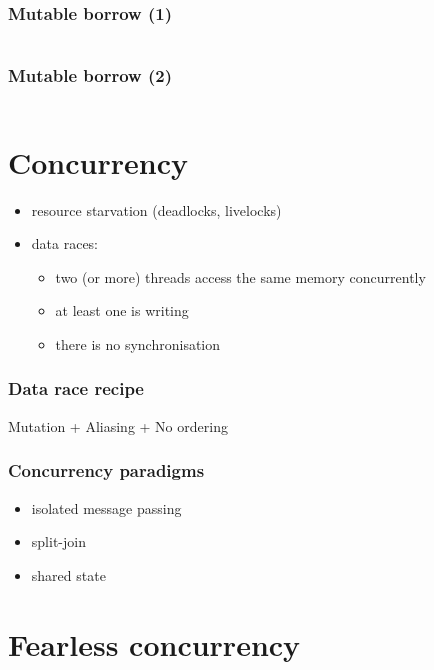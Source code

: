 \documentclass{beamer}
\begin{document}
\begin{frame}
    \frametitle{Mutable borrow (1)}
    \inputminted[fontsize=\scriptsize]{rust}{code/mutable_borrow1.rs}
\end{frame}

\begin{frame}
    \frametitle{Mutable borrow (2)}
    \inputminted[fontsize=\scriptsize]{rust}{code/mutable_borrow2.rs}
\end{frame}

\section{Concurrency}

\begin{frame}
    \begin{itemize}
            \frametitle{Concurrency Pitfalls}
        \item resource starvation (deadlocks, livelocks)
        \item data races:
            \begin{itemize}
                \item two (or more) threads access the same memory concurrently
                \item at least one is writing
                \item there is no synchronisation
            \end{itemize}
    \end{itemize}
\end{frame}

\begin{frame}
    \frametitle{Data race recipe}
    \begin{center}
        Mutation + Aliasing + No ordering
    \end{center}
\end{frame}

\begin{frame}
    \frametitle{Concurrency paradigms}
    \begin{itemize}
        \item isolated message passing
        \item split-join
        \item shared state
    \end{itemize}
\end{frame}

\section{Fearless concurrency}
\end{document}

